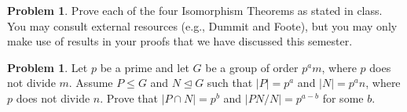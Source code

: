\documentclass[11pt]{scrartcl}
\theoremstyle{definition}
\newtheorem{problem}[theorem]{Problem}
\begin{document}
\begin{problem}
Prove each of the four Isomorphism Theorems as stated in class.  You may consult external resources (e.g., Dummit and Foote), but you may only make use of results in your proofs that we have discussed this semester.
\end{problem}

\begin{problem}
Let $p$ be a prime and let $G$ be a group of order $p^am$, where $p$ does not divide $m$.  Assume $P\leq G$ and $N\unlhd G$ such that $|P|=p^a$ and $|N|=p^an$, where $p$ does not divide $n$.  Prove that $|P\cap N|=p^b$ and $|PN/N|=p^{a-b}$ for some $b$.
\end{problem}
\end{document}

